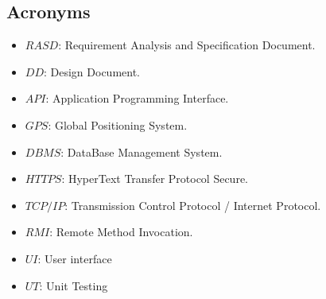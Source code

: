 \subsection{Acronyms}

\begin{itemize}
	\item $RASD$: Requirement Analysis and Specification Document.
	\item $DD$: Design Document.
	\item $API$: Application Programming Interface.
	\item $GPS$: Global Positioning System.
	\item $DBMS$: DataBase Management System.
	\item $HTTPS$: HyperText Transfer Protocol Secure.
	\item $TCP/IP$: Transmission Control Protocol / Internet Protocol.
	\item $RMI$: Remote Method Invocation.
	\item $UI$: User interface
	\item $UT$: Unit Testing

\end{itemize}
 